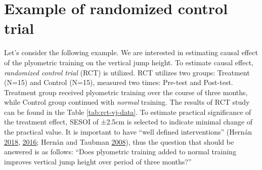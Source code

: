 \documentclass[
]{book}
\begin{document}
\hypertarget{example-of-randomized-control-trial}{%
\section{Example of randomized control trial}\label{example-of-randomized-control-trial}}

Let's consider the following example. We are interested in estimating causal effect of the plyometric training on the vertical jump height. To estimate causal effect, \emph{randomized control trial} (RCT) is utilized. RCT utilizes two groups: Treatment (N=15) and Control (N=15), measured two times: Pre-test and Post-test. Treatment group received plyometric training over the course of three months, while Control group continued with \emph{normal} training. The results of RCT study can be found in the Table \ref{tab:rct-vj-data}. To estimate practical significance of the treatment effect, SESOI of ±2.5cm is selected to indicate minimal change of the practical value. It is important to have ``well defined interventions'' (Hernán \protect\hyperlink{ref-hernanCWordScientificEuphemisms2018}{2018}, \protect\hyperlink{ref-hernanDoesWaterKill2016}{2016}; Hernán and Taubman \protect\hyperlink{ref-hernanDoesObesityShorten2008}{2008}), thus the question that should be answered is as follows: ``Does plyometric training added to normal training improves vertical jump height over period of three months?''
\end{document}
